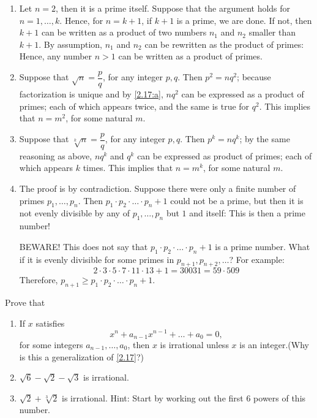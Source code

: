 \begin{solution} %
  \begin{enumerate}[label=(\alph*)]
    \item Let $n = 2$, then it is a prime itself. Suppose
    that the argument holds for $n=1,\dots,k$. Hence,
    for $n = k + 1$, if $k + 1$ is a prime, we are done. If not,
    then $k + 1$ can be written as a product
    of two numbers $n_1$ and $n_2$ smaller than $k + 1$.
    By assumption, $n_1$ and $n_2$ can be rewritten as
    the product of primes: Hence, any number $n > 1$
    can be written as a product of primes.
    \item Suppose that $\sqrt{n} = \dfrac{p}{q}$, for
    any integer $p,q$. Then $p^2 = nq^2$; because factorization
    is unique and by \ref{2.17:a}, $nq^2$ can be expressed
    as a product of primes; each of which appears
    twice, and the same is true for $q^2$.
    This implies that $n = m^2$, for some natural $m$.
    \item Suppose that $\sqrt[k]{n} = \dfrac{p}{q}$, for
    any integer $p,q$. Then $p^k = nq^k$; by the same
    reasoning as above, $nq^k$ and $q^k$ can be expressed
    as product of primes; each of which appears $k$ times.
    This implies that $n = m^k$, for some natural $m$.
    \item The proof is by contradiction. Suppose there were
    only a finite number of primes $p_1,\dots,p_n$. Then
    $p_1 \cdot p_2 \cdot \ldots \cdot p_n + 1$ could not
    be a prime, but then it is not evenly divisible by
    any of $p_1,\dots,p_n$ but $1$ and itself: This is
    then a prime number!
    \begin{ab}
      BEWARE! This does not say that
      $p_1 \cdot p_2 \cdot \ldots \cdot p_n + 1$ is
       a prime number. What if it is
      evenly divisible for some primes in
      $p_{n+1},p_{n+2},\dots$? For example:
      \begin{equation*}
        2 \cdot 3 \cdot 5 \cdot 7 \cdot 11 \cdot 13 + 1
        = 30031 = 59 \cdot 509
      \end{equation*}
      Therefore, $p_{n+1} \geq
      p_1 \cdot p_2 \cdot \ldots \cdot p_n + 1$.
    \end{ab}
  \end{enumerate}
\end{solution}

\begin{pr}[*] %
  Prove that
  \begin{enumerate}[label=(\alph*)]
    \item If $x$ satisfies
    \begin{equation*}
      x^n + a_{n-1}x^{n-1} + \dots + a_0 = 0,
    \end{equation*}
    for some integers $a_{n-1},\dots,a_0$, then $x$ is
    irrational unless $x$ is an integer.(Why is this
    a generalization of \autoref{2.17}?)
    \item $\sqrt{6} - \sqrt{2} - \sqrt{3}$ is irrational.
    \item $\sqrt{2} + \sqrt[3]{2}$ is irrational. Hint: Start
    by working out the first $6$ powers of this number.
  \end{enumerate}
\end{pr}

